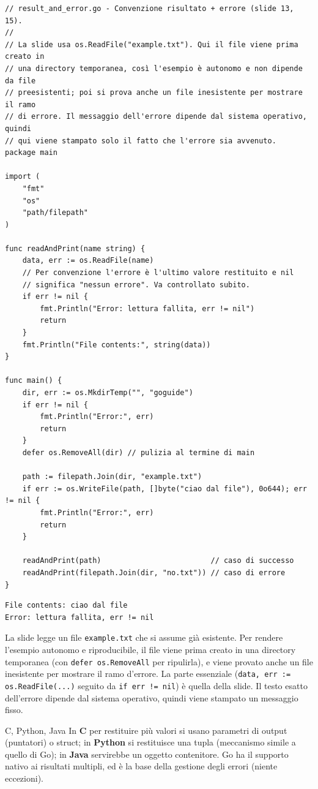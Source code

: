 \documentclass[11pt,a4paper]{report}
\newcommand{\cod}[1]{\texttt{#1}}
\begin{document}
\begin{lstlisting}[style=gocode,caption={\texttt{02\_functions/result\_and\_error.go}}]
// result_and_error.go - Convenzione risultato + errore (slide 13, 15).
//
// La slide usa os.ReadFile("example.txt"). Qui il file viene prima creato in
// una directory temporanea, così l'esempio è autonomo e non dipende da file
// preesistenti; poi si prova anche un file inesistente per mostrare il ramo
// di errore. Il messaggio dell'errore dipende dal sistema operativo, quindi
// qui viene stampato solo il fatto che l'errore sia avvenuto.
package main

import (
	"fmt"
	"os"
	"path/filepath"
)

func readAndPrint(name string) {
	data, err := os.ReadFile(name)
	// Per convenzione l'errore è l'ultimo valore restituito e nil
	// significa "nessun errore". Va controllato subito.
	if err != nil {
		fmt.Println("Error: lettura fallita, err != nil")
		return
	}
	fmt.Println("File contents:", string(data))
}

func main() {
	dir, err := os.MkdirTemp("", "goguide")
	if err != nil {
		fmt.Println("Error:", err)
		return
	}
	defer os.RemoveAll(dir) // pulizia al termine di main

	path := filepath.Join(dir, "example.txt")
	if err := os.WriteFile(path, []byte("ciao dal file"), 0o644); err != nil {
		fmt.Println("Error:", err)
		return
	}

	readAndPrint(path)                         // caso di successo
	readAndPrint(filepath.Join(dir, "no.txt")) // caso di errore
}
\end{lstlisting}
\begin{lstlisting}[style=output]
File contents: ciao dal file
Error: lettura fallita, err != nil
\end{lstlisting}

\begin{nota}
La slide legge un file \texttt{example.txt} che si assume già esistente. Per
rendere l'esempio autonomo e riproducibile, il file viene prima creato in una
directory temporanea (con \cod{defer os.RemoveAll} per ripulirla), e
viene provato anche un file inesistente per mostrare il ramo d'errore. La parte
essenziale (\cod{data, err := os.ReadFile(...)} seguito da \cod{if err != nil})
è quella della slide. Il testo esatto dell'errore dipende dal sistema operativo,
quindi viene stampato un messaggio fisso.
\end{nota}

\begin{confronto}{C, Python, Java}
In \textbf{C} per restituire più valori si usano parametri di output
(puntatori) o struct; in \textbf{Python} si restituisce una tupla (meccanismo
simile a quello di Go); in \textbf{Java} servirebbe un oggetto contenitore.
Go ha il supporto nativo ai risultati multipli, ed è la base della gestione
degli errori (niente eccezioni).
\end{confronto}
\end{document}
